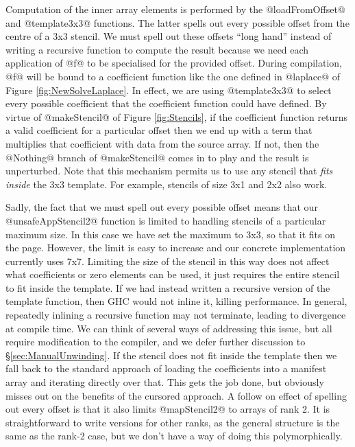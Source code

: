 Computation of the inner array elements is performed by the @loadFromOffset@ and @template3x3@ functions. The latter spells out every possible offset from the centre of a 3x3 stencil. We must spell out these offsets ``long hand'' instead of writing a recursive function to compute the result because we need each application of @f@ to be specialised for the provided offset. During compilation, @f@ will be bound to a coefficient function like the one defined in @laplace@ of Figure \ref{fig:NewSolveLaplace}. In effect, we are using @template3x3@ to select every possible coefficient that the coefficient function could have defined. By virtue of @makeStencil@ of Figure \ref{fig:Stencils}, if the coefficient function returns a valid coefficient for a particular offset then we end up with a term that multiplies that coefficient with data from the source array. If not, then the @Nothing@ branch of @makeStencil@ comes in to play and the result is unperturbed. Note that this mechanism permits us to use any stencil that \emph{fits inside} the 3x3 template. For example, stencils of size 3x1 and 2x2 also work.

Sadly, the fact that we must spell out every possible offset means that our @unsafeAppStencil2@ function is limited to handling stencils of a particular maximum size. In this case we have set the maximum to 3x3, so that it fits on the page. However, the limit is easy to increase and our concrete implementation currently uses 7x7. Limiting the size of the stencil in this way does not affect what coefficients or zero elements can be used, it just requires the entire stencil to fit inside the template. If we had instead written a recursive version of the template function, then GHC would not inline it, killing performance. In general, repeatedly inlining a recursive function may not terminate, leading to divergence at compile time. We can think of several ways of addressing this issue, but all require modification to the compiler, and we defer further discussion to \S\ref{sec:ManualUnwinding}. If the stencil does not fit inside the template then we fall back to the standard approach of loading the coefficients into a manifest array and iterating directly over that. This gets the job done, but obviously misses out on the benefits of the cursored approach. A follow on effect of spelling out every offset is that it also limits @mapStencil2@ to arrays of rank 2. It is straightforward to write versions for other ranks, as the general structure is the same as the rank-2 case, but we don't have a way of doing this polymorphically.


